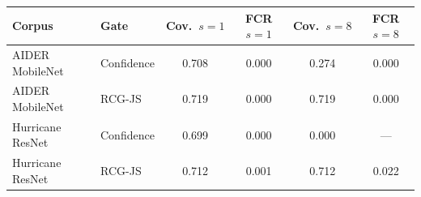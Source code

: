 \begin{tabular}{llcccc}
\toprule
Corpus & Gate & Cov.\ $s{=}1$ & FCR $s{=}1$ & Cov.\ $s{=}8$ & FCR $s{=}8$ \\
\midrule
AIDER MobileNet & Confidence & 0.708 & 0.000 & 0.274 & 0.000 \\
AIDER MobileNet & RCG-JS & 0.719 & 0.000 & 0.719 & 0.000 \\
Hurricane ResNet & Confidence & 0.699 & 0.000 & 0.000 & --- \\
Hurricane ResNet & RCG-JS & 0.712 & 0.001 & 0.712 & 0.022 \\
\bottomrule
\end{tabular}

